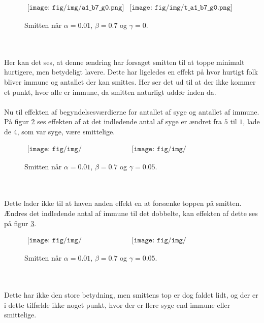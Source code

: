 %
\begin{figure}[!ht]
\centering
$
\begin{matrix}
\texttt{[image: fig/img/a1\_b7\_g0.png]}&
\texttt{[image: fig/img/t\_a1\_b7\_g0.png]}
\end{matrix}
$
\caption{Smitten når $\alpha = 0.01$, $\beta = 0.7$ og $\gamma = 0$.}
\label{fig:a1_b7_g0}
\end{figure}\\\\
%
Her kan det ses, at denne ændring har forsaget smitten til at toppe minimalt hurtigere, men betydeligt lavere.
Dette har ligeledes en effekt på hvor hurtigt folk bliver immune og antallet der kan smittes.
Her ser det ud til at der ikke kommer et punkt, hvor alle er immune, da smitten naturligt uddør inden da.\\\\
%
Nu til effekten af begyndelsesværdierne for antallet af syge og antallet af immune.
På figur \ref{fig:x1_1_x2_95} ses effekten af at det indledende antal af syge er ændret fra $5$ til $1$, lade de $4$, som var syge, være smittelige.
%
\begin{figure}[!ht]
\centering
$
\begin{matrix}
\texttt{[image: fig/img/x1\_1\_x2\_95.png]}&
\texttt{[image: fig/img/t\_x1\_1\_x2\_95.png]}
\end{matrix}
$
\caption{Smitten når $\alpha = 0.01$, $\beta = 0.7$ og $\gamma = 0.05$.}
\label{fig:x1_1_x2_95}
\end{figure}\\\\
%
Dette lader ikke til at haven anden effekt en at forsænke toppen på smitten.
Ændres det indledende antal af immune til det dobbelte, kan effekten af dette ses på figur \ref{fig:x1_5_x2_85}.
%
\begin{figure}[!ht]
\centering
$
\begin{matrix}
\texttt{[image: fig/img/x1\_5\_x2\_85.png]}&
\texttt{[image: fig/img/t\_x1\_5\_x2\_85.png]}
\end{matrix}
$
\caption{Smitten når $\alpha = 0.01$, $\beta = 0.7$ og $\gamma = 0.05$.}
\label{fig:x1_5_x2_85}
\end{figure}\\\\
%
Dette har ikke den store betydning, men smittens top er dog faldet lidt, og der er i dette tilfælde ikke noget punkt, hvor der er flere syge end immune eller smittelige.